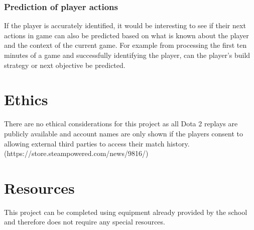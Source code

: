 \documentclass{sty/SizheArticle}
\newcommand{\dota}{Dota 2}
\begin{document}
\subsubsection{Prediction of player actions}\label{player-actions}
If the player is accurately identified, it would be interesting to see if their next actions in game can also be predicted based on what is known about the player and the context of the current game. For example from processing the first ten minutes of a game and successfully identifying the player, can the player's build strategy or next objective be predicted.


\section{Ethics}
There are no ethical considerations for this project as all \dota{} replays are publicly available and account names are only shown if the players consent to allowing external third parties to access their match history.
(https://store.steampowered.com/news/9816/)

\section{Resources}
This project can be completed using equipment already provided by the school and therefore does not require any special resources.
\end{document}
